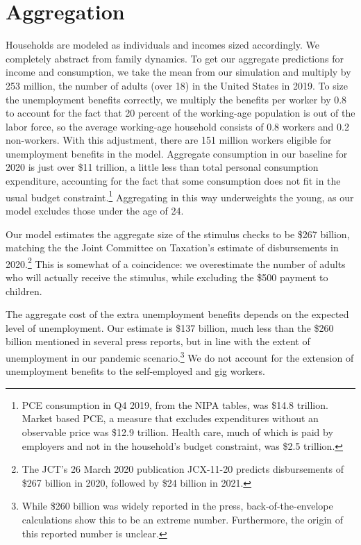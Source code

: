 \documentclass[./ConsumptionResponse]{subfiles}
\begin{document}
\section{Aggregation} \label{sec:aggregation}

Households are modeled as individuals and incomes sized accordingly.
We completely abstract from family dynamics.
To get our aggregate predictions for income and consumption, we take the mean from our simulation and multiply by 253 million, the number of adults (over 18) in the United States in 2019.
To size the unemployment benefits correctly, we multiply the benefits per worker by 0.8 to account for the fact that 20 percent of the working-age population is out of the labor force, so the average working-age household consists of 0.8 workers and 0.2 non-workers.
With this adjustment, there are 151 million workers eligible for unemployment benefits in the model.
Aggregate consumption in our baseline for 2020 is just over \$11 trillion, a little less than total personal consumption expenditure, accounting for the fact that some consumption does not fit in the usual budget constraint.\footnote{PCE consumption in Q4 2019, from the NIPA tables, was \$14.8 trillion. Market based PCE, a measure that excludes expenditures without an observable price was \$12.9 trillion. Health care, much of which is paid by employers and not in the household's budget constraint, was \$2.5 trillion.}
Aggregating in this way underweights the young, as our model excludes those under the age of 24.

Our model estimates the aggregate size of the stimulus checks to be \$267 billion, matching the the Joint Committee on Taxation's estimate of disbursements in 2020.\footnote{The JCT's 26 March 2020 publication JCX-11-20 predicts disbursements of \$267 billion in 2020, followed by \$24 billion in 2021.}
This is somewhat of a coincidence: we overestimate the number of adults who will actually receive the stimulus, while excluding the \$500 payment to children.

The aggregate cost of the extra unemployment benefits depends on the expected level of unemployment.
Our estimate is \$137 billion, much less than the \$260 billion mentioned in several press reports, but in line with the extent of unemployment in our pandemic scenario.\footnote{While \$260 billion was widely reported in the press, back-of-the-envelope calculations show this to be an extreme number. Furthermore, the origin of this reported number is unclear.} 
We do not account for the extension of unemployment benefits to the self-employed and gig workers.
\end{document}
